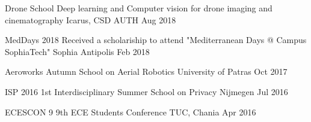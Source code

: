
\begin{cvhonors}

  \cvhonor
    {Drone School} %
    {Deep learning and Computer vision for drone imaging and cinematography} %
    {Icarus, CSD AUTH} %
    {Aug 2018} %

  \cvhonor
    {MedDays 2018} %
    {Received a scholariship to attend "Mediterranean Days @ Campus SophiaTech"} %
    {Sophia Antipolis} %
    {Feb 2018} %

  \cvhonor
    {Aeroworks} %
    {Autumn School on Aerial Robotics} %
    {University of Patras} %
    {Oct 2017} %

  \cvhonor
    {ISP 2016} %
    {1st Interdisciplinary Summer School on Privacy} %
    {Nijmegen} %
    {Jul 2016} %

  \cvhonor
    {ECESCON 9} %
    {9th ECE Students Conference} %
    {TUC, Chania} %
    {Apr 2016} %

\end{cvhonors}